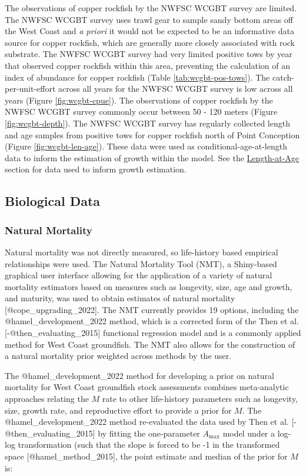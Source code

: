 \documentclass[11pt,
  letterpaper,
]{article}
\begin{document}
The observations of copper rockfish by the NWFSC WCGBT survey are limited. The NWFSC WCGBT survey uses trawl gear to sample sandy bottom areas off the West Coast and \emph{a priori} it would not be expected to be an informative data source for copper rockfish, which are generally more closely associated with rock substrate. The NWFSC WCGBT survey had very limited positive tows by year that observed copper rockfish within this area, preventing the calculation of an index of abundance for copper rockfish (Table \ref{tab:wcgbt-pos-tows}). The catch-per-unit-effort across all years for the NWFSC WCGBT survey is low across all years (Figure \ref{fig:wcgbt-cpue}). The observations of copper rockfish by the NWFSC WCGBT survey commonly occur between 50 - 120 meters (Figure \ref{fig:wcgbt-depth}). The NWFSC WCGBT survey has regularly collected length and age samples from positive tows for copper rockfish north of Point Conception (Figure \ref{fig:wcgbt-len-age}). These data were used as conditional-age-at-length data to inform the estimation of growth within the model. See the \hyperref[length-at-age]{Length-at-Age} section for data used to inform growth estimation.

\subsection{Biological Data}\label{biological-data}

\subsubsection{Natural Mortality}\label{natural-mortality}

Natural mortality was not directly measured, so life-history based empirical relationships were used. The Natural Mortality Tool (NMT), a Shiny-based graphical user interface allowing for the application of a variety of natural mortality estimators based on measures such as longevity, size, age and growth, and maturity, was used to obtain estimates of natural mortality {[}@cope\_upgrading\_2022{]}. The NMT currently provides 19 options, including the @hamel\_development\_2022 method, which is a corrected form of the Then et al. {[}-@then\_evaluating\_2015{]} functional regression model and is a commonly applied method for West Coast groundfish. The NMT also allows for the construction of a natural mortality prior weighted across methods by the user.

The @hamel\_development\_2022 method for developing a prior on natural mortality for West Coast groundfish stock assessments combines meta-analytic approaches relating the \(M\) rate to other life-history parameters such as longevity, size, growth rate, and reproductive effort to provide a prior for \(M\). The @hamel\_development\_2022 method re-evaluated the data used by Then et al. {[}-@then\_evaluating\_2015{]} by fitting the one-parameter \(A_{\text{max}}\) model under a log-log transformation (such that the slope is forced to be -1 in the transformed space {[}@hamel\_method\_2015{]}, the point estimate and median of the prior for \(M\) is:
\end{document}
